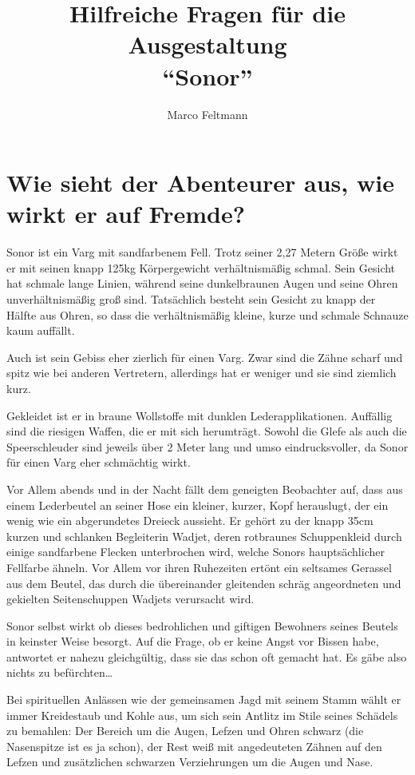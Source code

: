 \documentclass{article}
\author{Marco Feltmann}
\title{Hilfreiche Fragen für die Ausgestaltung \\ \enquote{Sonor} }
\begin{document}
	\maketitle
	
	\tableofcontents
	
	\section[Aussehen]{Wie sieht der Abenteurer aus, wie wirkt er auf Fremde?}
	
	Sonor ist ein Varg mit sandfarbenem Fell. Trotz
	seiner 2,27 Metern Größe wirkt er mit seinen knapp 125kg Körpergewicht
	verhältnismäßig schmal. Sein Gesicht hat schmale lange Linien, während
	seine dunkelbraunen Augen und seine Ohren unverhältnismäßig groß sind.
	Tatsächlich besteht sein Gesicht zu knapp der Hälfte aus Ohren, so dass
	die verhältnismäßig kleine, kurze und schmale Schnauze kaum auffällt.

	Auch ist sein Gebiss eher zierlich für einen Varg. Zwar sind die Zähne
	scharf und spitz wie bei anderen Vertretern, allerdings hat er
	weniger und sie sind ziemlich kurz.

	Gekleidet ist er in braune Wollstoffe mit dunklen Lederapplikationen.
	Auffällig sind die riesigen Waffen, die er mit sich herumträgt. Sowohl
	die Glefe als auch die Speerschleuder sind jeweils über 2 Meter lang und
	umso eindrucksvoller, da Sonor für einen Varg eher schmächtig wirkt.

	Vor Allem abends und in der Nacht fällt dem geneigten Beobachter auf,
	dass aus einem Lederbeutel an seiner Hose ein kleiner, kurzer,
	Kopf herauslugt, der ein wenig wie ein abgerundetes Dreieck aussieht.
	Er gehört zu der knapp 35cm kurzen und schlanken Begleiterin Wadjet,
	deren rotbraunes Schuppenkleid durch einige sandfarbene Flecken
	unterbrochen wird, welche Sonors hauptsächlicher Fellfarbe ähneln.
	Vor Allem vor ihren Ruhezeiten ertönt ein seltsames Gerassel aus dem
	Beutel, das durch die übereinander gleitenden schräg angeordneten und
	gekielten Seitenschuppen Wadjets verursacht wird.

	Sonor selbst wirkt ob dieses bedrohlichen und giftigen Bewohners seines
	Beutels in keinster Weise besorgt. Auf die Frage, ob er keine Angst vor
	Bissen habe, antwortet er nahezu gleichgültig, dass sie das schon oft
	gemacht hat. Es gäbe also nichts zu befürchten\ldots

	Bei spirituellen Anlässen wie der gemeinsamen Jagd mit seinem Stamm
	wählt er immer Kreidestaub und Kohle aus, um sich sein Antlitz im Stile
	seines Schädels zu bemahlen: Der Bereich um die Augen, Lefzen und Ohren schwarz
	(die Nasenspitze ist es ja schon), der Rest weiß mit angedeuteten Zähnen
	auf den Lefzen und zusätzlichen schwarzen Verziehrungen um die Augen und
	Nase.
	
\end{document}
